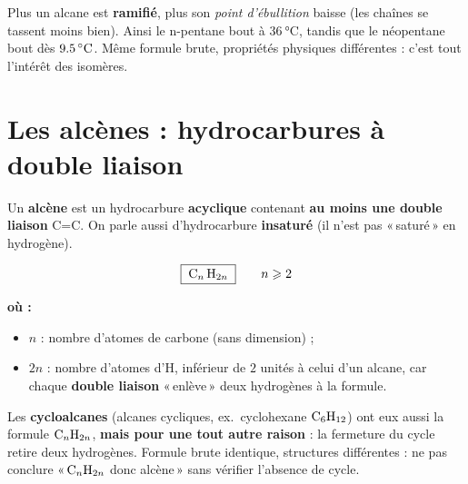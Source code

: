 \documentclass[11pt,a4paper]{article}
\newenvironment{ou}{%
  \par\smallskip\noindent\textbf{où :}\nopagebreak
  \begin{itemize}[leftmargin=1.8em,topsep=2pt,itemsep=1.5pt,parsep=0pt]}%
  {\end{itemize}}
\begin{document}
\begin{remarque}
Plus un alcane est \textbf{ramifié}, plus son \emph{point d'ébullition} baisse (les chaînes se tassent moins bien). Ainsi le n-pentane bout à $\qty{36}{\celsius}$, tandis que le néopentane bout dès $\qty{9{,}5}{\celsius}$. Même formule brute, propriétés physiques différentes : c'est tout l'intérêt des isomères.
\end{remarque}

\section{Les alcènes : hydrocarbures à double liaison}
\label{sec:alcenes}
\begin{definition}[Alcène]
Un \textbf{alcène} est un hydrocarbure \textbf{acyclique} contenant \textbf{au moins une double liaison} C=C. On parle aussi d'hydrocarbure \textbf{insaturé} (il n'est pas «\,saturé\,» en hydrogène).
\end{definition}

\begin{formule}
\[
\boxed{\;\ce{C_n H_{2n}}\;}
\qquad n\geqslant 2
\]
\begin{ou}
  \item $n$ : nombre d'atomes de carbone (sans dimension) ;
  \item $2n$ : nombre d'atomes d'H, inférieur de $2$ unités à celui d'un alcane, car chaque \textbf{double liaison} «\,enlève\,» deux hydrogènes à la formule.
\end{ou}
\end{formule}

\begin{attention}
Les \textbf{cycloalcanes} (alcanes cycliques, ex.\ cyclohexane $\ce{C6H12}$) ont eux aussi la formule $\ce{C_nH_{2n}}$, \textbf{mais pour une tout autre raison} : la fermeture du cycle retire deux hydrogènes. Formule brute identique, structures différentes : ne pas conclure «\,$\ce{C_nH_{2n}}$ donc alcène\,» sans vérifier l'absence de cycle.
\end{attention}
\end{document}
